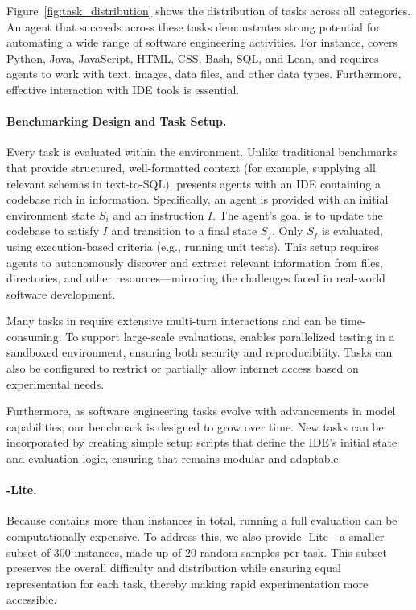 Figure~\ref{fig:task_distribution} shows the distribution of tasks across all categories. An agent that succeeds across these tasks demonstrates strong potential for automating a wide range of software engineering activities.
For instance, \bench{} covers Python, Java, JavaScript, HTML, CSS, Bash, SQL, and Lean, and requires agents to work with text, images, data files, and other data types. Furthermore, effective interaction with IDE tools is essential.







\paragraph{Benchmarking Design and Task Setup.}

Every task is evaluated within the \ours{} environment. Unlike traditional benchmarks that provide structured, well-formatted context (for example, supplying all relevant schemas in text-to-SQL), \bench{} presents agents with an IDE containing a codebase rich in information. Specifically, an agent is provided with an initial environment state $S_i$ and an instruction $I$. The agent's goal is to update the codebase to satisfy $I$ and transition to a final state $S_f$. Only $S_f$ is evaluated, using execution-based criteria (e.g., running unit tests). This setup requires agents to autonomously discover and extract relevant information from files, directories, and other resources—mirroring the challenges faced in real-world software development.

Many tasks in \bench{} require extensive multi-turn interactions and can be time-consuming. To support large-scale evaluations, \ours{} enables parallelized testing in a sandboxed environment, ensuring both security and reproducibility. Tasks can also be configured to restrict or partially allow internet access based on experimental needs. 

Furthermore, as software engineering tasks evolve with advancements in model capabilities, our benchmark is designed to grow over time. New tasks can be incorporated by creating simple setup scripts that define the IDE's initial state and evaluation logic, ensuring that \bench{} remains modular and adaptable.

\paragraph{\bench{}-Lite.}

Because \bench{} contains more than \benchsize{} instances in total, running a full evaluation can be computationally expensive. To address this, we also provide \bench{}-Lite—a smaller subset of 300 instances, made up of 20 random samples per task. This subset preserves the overall difficulty and distribution while ensuring equal representation for each task, thereby making rapid experimentation more accessible.

